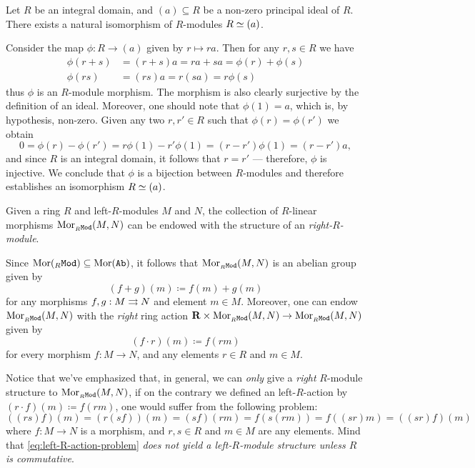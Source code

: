 \begin{example}
\label{exp:int-dom-iso-principal-ideal-R-mod}
Let \(R\) be an integral domain, and \((a) \subseteq R\) be a non-zero principal
ideal of \(R\). There exists a natural isomorphism of \(R\)-modules
\(R \simeq (a)\).

Consider the map \(\phi: R \to (a)\) given by \(r \mapsto r a\). Then for any
\(r, s \in R\) we have
\begin{align*}
  \phi(r + s) &= (r + s) a = r a + s a = \phi(r) + \phi(s) \\
  \phi(r s)   &= (r s) a = r (s a) = r \phi(s)
\end{align*}
thus \(\phi\) is an \(R\)-module morphism. The morphism is also clearly
surjective by the definition of an ideal. Moreover, one should note that
\(\phi(1) = a\), which is, by hypothesis, non-zero. Given any two
\(r, r' \in R\) such that \(\phi(r) = \phi(r')\) we obtain
\[
0 = \phi(r) - \phi(r') = r \phi(1) - r' \phi(1) = (r - r') \phi(1)
= (r - r') a,
\]
and since \(R\) is an integral domain, it follows that \(r = r'\) --- therefore,
\(\phi\) is injective. We conclude that \(\phi\) is a bijection between
\(R\)-modules and therefore establishes an isomorphism \(R \simeq (a)\).
\end{example}

\begin{example}
\label{exp:R-mod-hom-set-is-module}
Given a ring \(R\) and left-\(R\)-modules \(M\) and \(N\), the
collection of \(R\)-linear morphisms \(\operatorname{Mor}_{{{}_{R}\texttt{Mod}}}(M, N)\) can be endowed
with the structure of an \emph{right-\(R\)-module}.

Since \(\operatorname{Mor}({{}_{R}\texttt{Mod}}) \subseteq \operatorname{Mor}({\texttt{Ab}})\), it follows that
\(\operatorname{Mor}_{{{}_{R}\texttt{Mod}}}(M, N)\) is an abelian group given by
\[
(f + g)(m) \coloneq f(m) + g(m)
\]
for any morphisms \(f, g: M \rightrightarrows N\) and element \(m \in M\). Moreover, one can
endow \(\operatorname{Mor}_{{{}_{R}\texttt{Mod}}}(M, N)\) with the \emph{right} ring action
\(\mathbf{R} \times \operatorname{Mor}_{{{}_{R}\texttt{Mod}}}(M, N) \to \operatorname{Mor}_{{{}_{R}\texttt{Mod}}}(M, N)\) given by
\[
(f \cdot r)(m) \coloneq f(r m)
\]
for every morphism \(f: M \to N\), and any elements \(r \in R\) and \(m \in M\).

Notice that we've emphasized that, in general, we can \emph{only} give a
\emph{right} \(R\)-module structure to \(\operatorname{Mor}_{{{}_{R}\texttt{Mod}}}(M, N)\), if on the
contrary we defined an left-\(R\)-action by \((r \cdot f)(m) \coloneq f(r m)\),
one would suffer from the following problem:
\begin{equation}\label{eq:left-R-action-problem}
((r s) f)(m) = (r(s f))(m) = (s f)(r m) = f(s (r m)) = f((s r) m) = ((s r) f)(m)
\end{equation}
where \(f: M \to N\) is a morphism, and \(r, s \in R\) and \(m \in M\) are any
elements. Mind that \cref{eq:left-R-action-problem} \emph{does not yield a
left-\(R\)-module structure unless \(R\) is commutative}.
\end{example}

